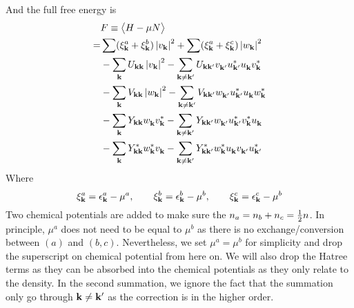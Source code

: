 And the full free energy is 
\begin{equation}\label{eq:uvw:F}
 \begin{split}
  &F\equiv\bigl<{H-\mu{}N}\bigr>\\
    =&\sum(\xi^a_{\mathbf{k}}+\xi^b_{\mathbf{k}})\left\lvert{v_{\ensuremath{\mathbf{k}}}}\right\rvert^2+\sum(\xi^a_{\mathbf{k}}+\xi^c_{\mathbf{k}})\left\lvert{w_{\ensuremath{\mathbf{k}}}}\right\rvert^2\\
    &-\sum_{\mathbf{k}}U_{\mathbf{k}\mathbf{k}}\left\lvert{v_{\ensuremath{\mathbf{k}}}}\right\rvert^2-\sum_{\mathbf{k}\neq\mathbf{k}'}U_{\mathbf{k}\mathbf{k}'}v^{}_{\mathbf{k}'}u^*_{\mathbf{k}'}u^{}_{\mathbf{k}}{}v^*_{\mathbf{k}}\\
    &-\sum_{\mathbf{k}}V_{\mathbf{k}\mathbf{k}}\left\lvert{w_{\ensuremath{\mathbf{k}}}}\right\rvert^2
      -\sum_{\mathbf{k}\neq\mathbf{k}'}V_{\mathbf{k}\mathbf{k}'}w^{}_{\mathbf{k}'}u^*_{\mathbf{k}'}u^{}_{\mathbf{k}}{}w^*_{\mathbf{k}}\\
    &-\sum_{\mathbf{k}}Y_{\mathbf{k}\mathbf{k}}w^{}_{\mathbf{k}}v^*_{\mathbf{k}}{}
      -\sum_{\mathbf{k}\neq\mathbf{k}'}Y_{\mathbf{k}\mathbf{k}'}w^{}_{\mathbf{k}'}{u^{*}_{\mathbf{k}'}}v^*_{\mathbf{k}}{}u^{}_{\mathbf{k}}\\
    &-\sum_{\mathbf{k}}Y^*_{\mathbf{k}\mathbf{k}}w^*_{\mathbf{k}}v^{}_{\mathbf{k}}{}
      -\sum_{\mathbf{k}\neq\mathbf{k}'}Y^*_{\mathbf{k}\mathbf{k}'}w^*_{\mathbf{k}}{u^{}_{\mathbf{k}}}v^{}_{\mathbf{k}'}{}u^{*}_{\mathbf{k}'}
 \end{split}
\end{equation}
Where 
\begin{equation*}
 \xi^a_{\mathbf{k}}=\epsilon^a_{\mathbf{k}}-\mu^a,\qquad\xi^b_{\mathbf{k}}=\epsilon^b_{\mathbf{k}}-\mu^b,\qquad\xi^c_{\mathbf{k}}=\epsilon^c_{\mathbf{k}}-\mu^b
\end{equation*}
Two chemical potentials are added to make sure the $n_a=n_b+n_c=\frac{1}{2}n$.  In principle, $\mu^{a}$ does not need to be equal to $\mu^{b}$  as there is no exchange/conversion between $(a)$ and $(b,c)$.  Nevertheless, we  set $\mu^{a}=\mu^{b}$ for simplicity and drop the superscript on chemical potential from here on. 
We will also drop the Hatree terms as they can be absorbed into the chemical potentials as they only relate to the density.   In the second summation, we ignore the fact that the summation only go through $\mathbf{k}\neq\mathbf{k}'$ as the correction is in the higher order. 
 
